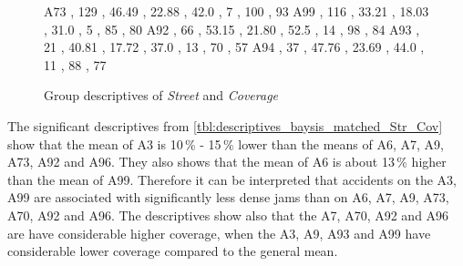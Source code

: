 \begin{figure}[ht!]
\begin{minipage}{0.55\textwidth}
{			A73 , 129 , 46.49 , 22.88 , 42.0 , 7  , 100 , 93 
			A99 , 116 , 33.21 , 18.03 , 31.0 , 5  , 85  , 80 
			A92 , 66  , 53.15 , 21.80 , 52.5 , 14 , 98  , 84 
			A93 , 21  , 40.81 , 17.72 , 37.0 , 13 , 70  , 57 
			A94 , 37  , 47.76 , 23.69 , 44.0 , 11 , 88  , 77 
		}\data
        \pgfplotstablesort[sort key=mean, sort cmp=float >]{\datasorted}{\data}
        \tiny
        \centering
		\label{fig:descriptives_baysis_matched_Str_Cov}
	\end{minipage}%
	\caption{Group descriptives of \textit{Street} and \textit{Coverage}}
\end{figure}
The significant descriptives from \cref{tbl:descriptives_baysis_matched_Str_Cov} show that the mean of A3 is 10\,\% - 15\,\% lower than the means of A6, A7, A9, A73, A92 and A96. They also shows that the mean of A6 is about 13\,\% higher than the mean of A99. Therefore it can be interpreted that accidents on the A3, A99 are associated with significantly less dense jams than on A6, A7, A9, A73, A70, A92 and A96. The descriptives show also that the A7, A70, A92 and A96 are have considerable higher coverage, when the A3, A9, A93 and A99 have considerable lower coverage compared to the general mean.

\label{ana:baysis_global_Kat}
 

